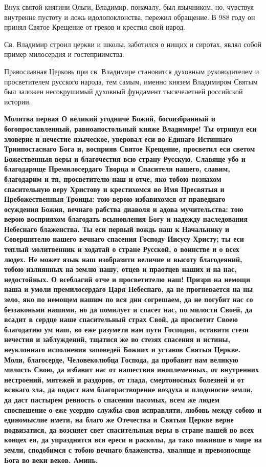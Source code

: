 
Внук святой княгини Ольги, Владимир, поначалу, был язычником, но, чувствуя внутренне пустоту и ложь идолопоклонства, пережил обращение. В 988 году он принял Святое Крещение от греков и крестил свой народ. 


Св. Владимир строил церкви и школы, заботился о нищих и сиротах, являл собой пример милосердия и гостеприимства. 


Православная Церковь при св. Владимире становится духовным руководителем и просветителем русского народа, тем самым, именно князем Владимиром Святым был заложен несокрушимый духовный фундамент тысячелетней российской истории.


\medskip
\bfseries Молитва первая\normalfont{}
О великий угодниче Божий, богоизбранный и богопрославленный, равноапостольный княже Владимире! Ты отринул еси зловерие и нечестие языческое, уверовал еси во Единаго Истиннаго Триипостаснаго Бога и, восприяв Святое Крещение, просветил еси светом Божественныя веры и благочестия всю страну Русскую. Славяще убо и благодаряще Премилосердаго Творца и Спасителя нашего, славим, благодарим и тя, просветителю наш и отче, яко тобою познахом спасительную веру Христову и крестихомся во Имя Пресвятыя и Пребожественныя Троицы: тою верою избавихомся от праведнаго осуждения Божия, вечнаго рабства диаволя и адова мучительства: тою верою восприяхом благодать всыновления Богу и надежду наследования Небеснаго блаженства. Ты еси первый вождь наш к Начальнику и Совершителю нашего вечнаго спасения Господу Иисусу Христу; ты еси теплый молитвенник и ходатай о стране Русской, о воинстве и о всех людех. Не может язык наш изобразити величие и высоту благодеяний, тобою излиянных на землю нашу, отцев и праотцев наших и на нас, недостойных. О всеблагий отче и просветителю наш! Призри на немощи наша и умоли премилосердаго Царя Небеснаго, да не прогневается на ны зело, яко по немощем нашим по вся дни согрешаем, да не погубит нас со беззаконьми нашими, но да помилует и спасет нас, по милости Своей, да всадит в сердце наше спасительный страх Свой, да просветит Своею благодатию ум наш, во еже разумети нам пути Господни, оставити стези нечестия и заблуждений, тщатися же во стезях спасения и истины, неуклоннаго исполнения заповедей Божиих и уставов Святыя Церкве. Моли, благосерде, Человеколюбца Господа, да пробавит нам великую милость Свою, да избавит нас от нашествия иноплеменных, от внутренних нестроений, мятежей и раздоров, от глада, смертоносных болезней и от всякаго зла, да подаст нам благорастворение воздуха и плодоносие земли, да даст пастырем ревность о спасении пасомых, всем же людем споспешение о еже усердно службы своя исправляти, любовь между собою и единомыслие имети, на благо же Отечества и Святыя Церкве верне подвизатися, да возсияет свет спасительныя веры в стране нашей во всех концех ея, да упразднятся вся ереси и расколы, да тако поживше в мире на земли, сподобимся с тобою вечнаго блаженства, хваляще и превозносяще Бога во веки веков. Аминь.


